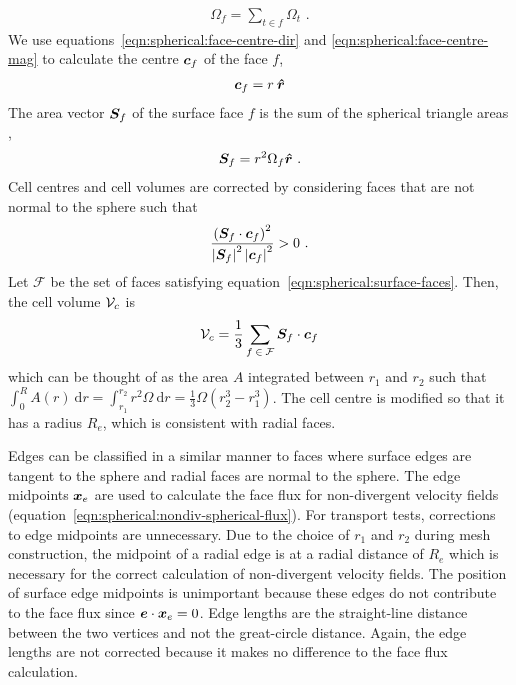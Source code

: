 \begin{align}
	\Omega_f = \sum_{t\in f}{\Omega_t} \text{ .}
\end{align}
We use equations~\eqref{eqn:spherical:face-centre-dir} and \eqref{eqn:spherical:face-centre-mag} to calculate the centre $\bm{c}_f$ of the face $f$,
\begin{align}
	\bm{c}_f = r\:\bm{\hat{r}} \label{eqn:spherical:face-centre}
\end{align}
The area vector $\bm{S}_f$ of the surface face $f$ is the sum of the spherical triangle areas \citep{vanbrummelen2013},
\begin{align}
	\bm{S}_f = r^2 \Omega_f \bm{\hat{r}} \text{ .}
\end{align}
Cell centres and cell volumes are corrected by considering faces that are not normal to the sphere such that
\begin{align}
	\frac{\left(\bm{S}_f \cdot \bm{c}_f\right)^2}{\left\lvert \bm{S}_f \right\rvert^2 \left\lvert \bm{c}_f \right\rvert^2} > 0 \label{eqn:spherical:surface-faces} \text{ .}
\end{align}
Let $\mathcal{F}$ be the set of faces satisfying equation~\eqref{eqn:spherical:surface-faces}.  Then, the cell volume $\mathcal{V}_c$ is
\begin{align}
	\mathcal{V}_c = \frac{1}{3} \sum_{f\:\in\:\mathcal{F}} \bm{S}_f \cdot \bm{c}_f
\end{align}
which can be thought of as the area $A$ integrated between $r_1$ and $r_2$ such that 
$\int_0^R{A(r)\:\mathrm{d}r} = \int_{r_1}^{r_2}{r^2 \Omega\:\mathrm{d}r} = \frac{1}{3} \Omega \left( r_2^3 - r_1^3 \right)$.
The cell centre is modified so that it has a radius $R_e$, which is consistent with radial faces.

Edges can be classified in a similar manner to faces where surface edges are tangent to the sphere and radial faces are normal to the sphere.  The edge midpoints $\bm{x}_e$ are used to calculate the face flux for non-divergent velocity fields (equation~\ref{eqn:spherical:nondiv-spherical-flux}).
For transport tests, corrections to edge midpoints are unnecessary.  Due to the choice of $r_1$ and $r_2$ during mesh construction, the midpoint of a radial edge is at a radial distance of $R_e$ which is necessary for the correct calculation of non-divergent velocity fields.
The position of surface edge midpoints is unimportant because these edges do not contribute to the face flux since $\bm{e} \cdot \bm{x}_e = 0$.
Edge lengths are the straight-line distance between the two vertices and not the great-circle distance.  Again, the edge lengths are not corrected because it makes no difference to the face flux calculation.

